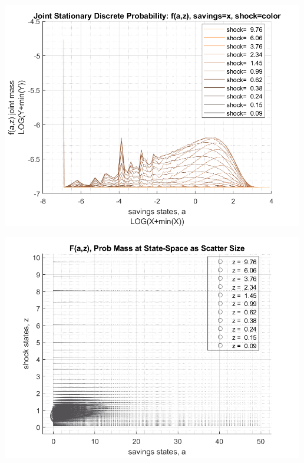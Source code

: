 \documentclass[
]{book}
\begin{document}
\includegraphics[width=5.20833in,height=\textheight]{img/fx_ds_az_cts_loop_images/figure_15.png}

\includegraphics[width=5.20833in,height=\textheight]{img/fx_ds_az_cts_loop_images/figure_16.png}
\end{document}
